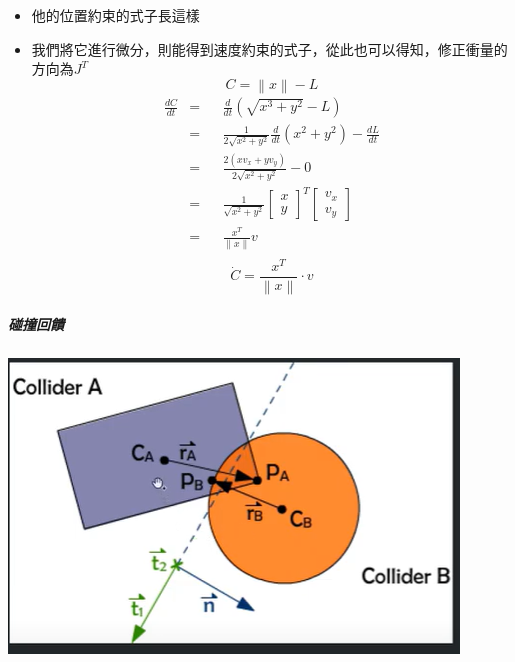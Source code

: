 \begin{itemize}
    \item{他的位置約束的式子長這樣}
    \item{我們將它進行微分，則能得到速度約束的式子，從此也可以得知，修正衝量的方向為$J^{T}$}
        \begin{equation} C = \left \|x  \right \| - L \end{equation}
        \begin{equation}
            \begin{aligned}
            \frac{dC}{dt}&=&& \frac{d}{dt}\left(\sqrt{x^3+y^2}-L\right) \\
                         &=&& \frac{1}{2\sqrt{x^2+y^2}}\frac{d}{dt}(x^2+y^2)-\frac{dL}{dt}\\
                         &=&& \frac{2(xv_x+yv_y)}{2\sqrt{x^2+y^2}}-0\\
                         &=&& \frac{1}{\sqrt{x^2+y^2}} \begin{bmatrix}x\\y\end{bmatrix}^T \begin{bmatrix}v_x\\v_y\end{bmatrix} \\
                         &=&& \frac{x^T}{\parallel x\parallel}v \\
            \end{aligned}
        \end{equation}
        \begin{equation} \dot{C} = \frac{x^{T}}{\left \|x  \right \|} \cdot v \end{equation}
\end{itemize}

\subparagraph{碰撞回饋}
\subparagraph{\includegraphics[height=0.5\linewidth]{./resources/physics/feedback.png}}

